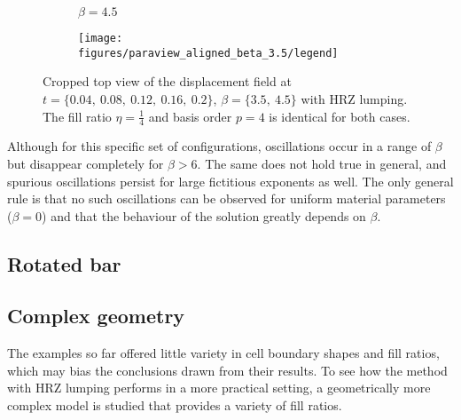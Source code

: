 \begin{figure}[!h]
\begin{subfigure}[b]{0.45\textwidth}
		\centering
		\caption{$\beta=4.5$}
	\end{subfigure}
	\begin{subfigure}[b]{0.95\textwidth}
		\centering
		\texttt{[image: figures/paraview\_aligned\_beta\_3.5/legend]}
	\end{subfigure}
	\caption{Cropped top view of the displacement field at $t=\{0.04, \ 0.08, \ 0.12, \ 0.16, \ 0.2\}$, $\beta = \{3.5, \ 4.5\}$ with HRZ lumping. The fill ratio $\eta=\frac{1}{4}$ and basis order $p=4$ is identical for both cases.}
	\label{fig:hrz_displacement_field_beta}
\end{figure}

Although for this specific set of configurations, oscillations occur in a range of $\beta$ but disappear completely for $\beta > 6$. The same does not hold true in general, and spurious oscillations persist for large fictitious exponents as well. The only general rule is that no such oscillations can be observed for uniform material parameters ($\beta=0$) and that the behaviour of the solution greatly depends on $\beta$.

%
\subsection{Rotated bar}
\label{section:rotated_bar}
%



%
\subsection{Complex geometry}
\label{section:complex_geometry}
%

The examples so far offered little variety in cell boundary shapes and fill ratios, which may bias the conclusions drawn from their results. To see how the method with HRZ lumping performs in a more practical setting, a geometrically more complex model is studied that provides a variety of fill ratios.

